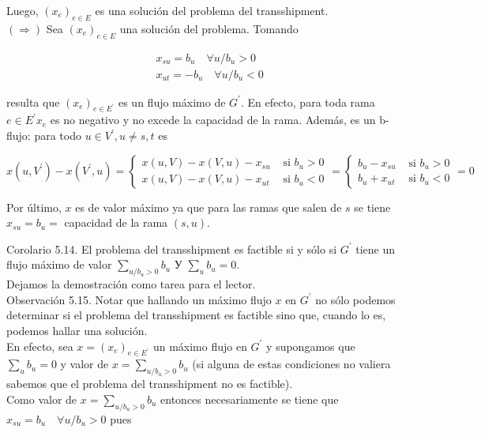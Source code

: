 \documentclass[10pt]{article}
\begin{document}
Luego, $\left(x_{e}\right)_{e \in E}$ es una solución del problema del transshipment.\\
$(\Longrightarrow)$ Sea $\left(x_{e}\right)_{e \in E}$ una solución del problema. Tomando

$$
\begin{aligned}
& x_{s u}=b_{u} \quad \forall u / b_{u}>0 \\
& x_{u t}=-b_{u} \quad \forall u / b_{u}<0
\end{aligned}
$$

resulta que $\left(x_{e}\right)_{e \in E^{\prime}}$ es un flujo máximo de $G^{\prime}$. En efecto, para toda rama $e \in E^{\prime} x_{e}$ es no negativo y no excede la capacidad de la rama. Además, es un b-flujo: para todo $u \in V^{\prime}, u \neq s, t$ es

$$
x\left(u, V^{\prime}\right)-x\left(V^{\prime}, u\right)=\left\{\begin{array}{ll}
x(u, V)-x(V, u)-x_{s u} & \text { si } b_{u}>0 \\
x(u, V)-x(V, u)-x_{u t} & \text { si } b_{u}<0
\end{array}=\left\{\begin{array}{ll}
b_{u}-x_{s u} & \text { si } b_{u}>0 \\
b_{u}+x_{u t} & \text { si } b_{u}<0
\end{array}=0\right.\right.
$$

Por último, $x$ es de valor máximo ya que para las ramas que salen de $s$ se tiene $x_{s u}=b_{u}=$ capacidad de la rama $(s, u)$.

Corolario 5.14. El problema del transshipment es factible si y sólo si $G^{\prime}$ tiene un flujo máximo de valor $\sum_{u / b_{u}>0} b_{u}$ У $\sum_{u} b_{u}=0$.\\
Dejamos la demostración como tarea para el lector.\\
Observación 5.15. Notar que hallando un máximo flujo $x$ en $G^{\prime}$ no sólo podemos determinar si el problema del transshipment es factible sino que, cuando lo es, podemos hallar una solución.\\
En efecto, sea $x=\left(x_{e}\right)_{e \in E^{\prime}}$ un máximo flujo en $G^{\prime}$ y supongamos que $\sum_{u} b_{u}=0$ y valor de $x=\sum_{u / b_{u}>0} b_{u}$ (si alguna de estas condiciones no valiera sabemos que el problema del transshipment no es factible).\\
Como valor de $x=\sum_{u / b_{u}>0} b_{u}$ entonces necesariamente se tiene que $x_{s u}=b_{u} \quad \forall u / b_{u}>0$ pues
\end{document}

